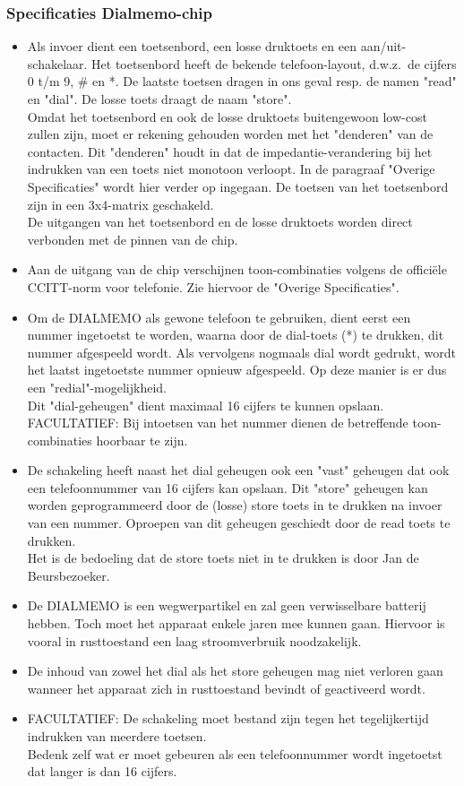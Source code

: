 \subsubsection{Specificaties Dialmemo-chip}


\begin{itemize}
\item
Als invoer dient een toetsenbord, een losse druktoets en een
aan/uit-schakelaar. Het toetsenbord heeft de bekende telefoon-layout,
d.w.z.\ de cijfers 0 t/m 9, \# en *. De laatste toetsen dragen in ons
geval resp. de namen "read" en "dial".
De losse toets draagt de naam "store".\\
Omdat het toetsenbord en ook de losse druktoets buitengewoon low-cost
zullen zijn, moet er rekening gehouden worden met het "denderen" van
de contacten. Dit "denderen" houdt in dat de impedantie-verandering
bij het indrukken van een toets niet monotoon verloopt. In de
paragraaf "Overige Specificaties" wordt hier verder op ingegaan. De
toetsen van het toetsenbord zijn in een 3x4-matrix geschakeld.\\
De uitgangen van het toetsenbord en de losse druktoets worden direct
verbonden met de pinnen van de chip.
\item
Aan de uitgang van de chip verschijnen toon-combinaties volgens de
offici\"ele CCITT-norm voor telefonie. Zie hiervoor de "Overige
Specificaties".
\item
Om de DIALMEMO als gewone telefoon te gebruiken, dient eerst een
nummer ingetoetst te worden, waarna door de dial-toets (*) te
drukken, dit nummer afgespeeld wordt. Als vervolgens nogmaals dial
wordt gedrukt, wordt het laatst ingetoetste nummer opnieuw afgespeeld.
Op deze manier is er dus een "redial"-mogelijkheid.\\
Dit "dial-geheugen" dient maximaal 16 cijfers te kunnen opslaan.\\
FACULTATIEF: Bij intoetsen van het nummer dienen de betreffende
toon-combinaties hoorbaar te zijn.
\item
De schakeling heeft naast het dial geheugen ook een "vast" geheugen
dat ook een telefoonnummer van 16 cijfers kan opslaan. Dit "store"
geheugen kan worden geprogrammeerd door de (losse) store toets in te
drukken na invoer van een nummer. Oproepen van dit geheugen geschiedt
door de read toets te drukken.\\
Het is de bedoeling dat de store toets niet in te drukken is door Jan
de Beursbezoeker.
\item
De DIALMEMO is een wegwerpartikel en zal geen verwisselbare batterij
hebben. Toch moet het apparaat enkele jaren mee kunnen gaan. Hiervoor
is vooral in rusttoestand een laag stroomverbruik noodzakelijk.
\item
De inhoud van zowel het dial als het store geheugen mag niet verloren
gaan wanneer het apparaat zich in rusttoestand bevindt of geactiveerd
wordt.
\item
FACULTATIEF: De schakeling moet bestand zijn tegen het tegelijkertijd
indrukken van meerdere toetsen.\\
Bedenk zelf wat er moet gebeuren als een telefoonnummer wordt ingetoetst
dat langer is dan 16 cijfers.
\end{itemize}




